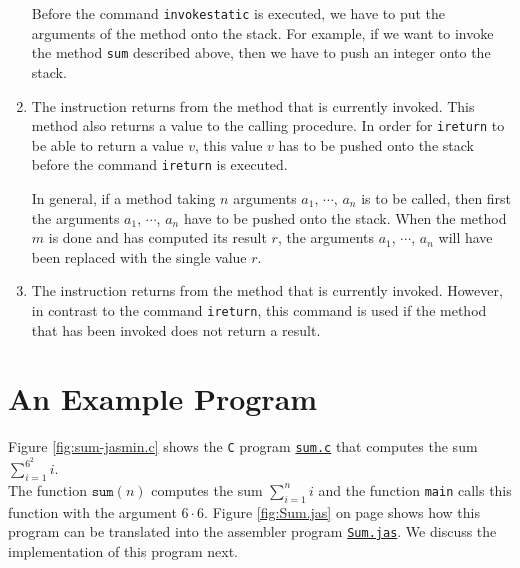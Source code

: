 \begin{enumerate}
      Before the command \texttt{invokestatic} is executed, we have to put the arguments of the method
      onto the stack.  For example, if we want to invoke the method \texttt{sum} described  above, then we
      have to push an integer onto the stack.
\item The instruction 
      returns from the method that is currently invoked.  This method also returns a value to the calling
      procedure.  In order for \texttt{ireturn} to be able to return a value $v$, this value $v$ has to be
      pushed onto the stack before the command \texttt{ireturn} is executed.

      In general, if a method taking $n$ arguments $a_1$, $\cdots$, $a_n$ is to be called, then first the
      arguments $a_1$, $\cdots$, $a_n$ have to be pushed onto the stack.  When the method $m$ is done and
      has computed its result $r$, the arguments $a_1$, $\cdots$, $a_n$ will have been replaced with the
      single value $r$.
\item The instruction 
      returns from the method that is currently invoked.  However, in contrast to the command
      \texttt{ireturn}, this command is used if the method that has been invoked  does not return a result. 
\end{enumerate}

\section{An Example Program}
Figure \ref{fig:sum-jasmin.c} shows the \texttt{C} program 
\href{https://github.com/karlstroetmann/Formal-Languages/tree/master/Jasmin/sum.c}{\texttt{sum.c}}
that computes the sum
\\[0.2cm]
\hspace*{1.3cm}
$\sum\limits_{i=1}^{6^2} i$.
\\[0.2cm]
The function $\mathtt{sum}(n)$ computes the sum $\sum_{i=1}^{n} i$ and the function
\texttt{main} calls this function with the argument $6 \cdot 6$.  Figure \ref{fig:Sum.jas} on page
\pageref{fig:Sum.jas} shows how this program can be translated 
into the assembler program 
\href{https://github.com/karlstroetmann/Formal-Languages/tree/master/Jasmin/Sum.jas}{\texttt{Sum.jas}}.
We discuss the implementation of this program next. 


